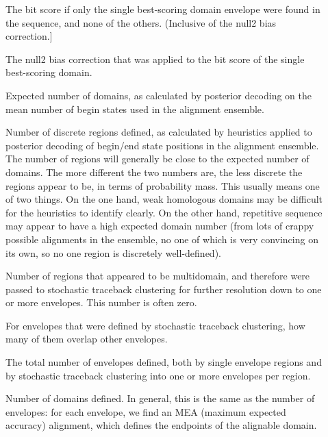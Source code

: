 \begin{description}
\item[]  The bit score if only the
  single best-scoring domain envelope were found in the sequence, and
  none of the others. (Inclusive of the null2 bias correction.]

\item[] The null2 bias correction
  that was applied to the bit score of the single best-scoring domain.

\item[] Expected number of domains, as calculated by
  posterior decoding on the mean number of begin states used in the
  alignment ensemble. 

\item[] Number of discrete regions defined, as
  calculated by heuristics applied to posterior decoding of begin/end
  state positions in the alignment ensemble.  The number of regions
  will generally be close to the expected number of domains. The more
  different the two numbers are, the less discrete the regions appear
  to be, in terms of probability mass. This usually means one of two
  things. On the one hand, weak homologous domains may be difficult
  for the heuristics to identify clearly. On the other hand,
  repetitive sequence may appear to have a high expected domain number
  (from lots of crappy possible alignments in the ensemble, no one of
  which is very convincing on its own, so no one region is discretely
  well-defined).

\item[] Number of regions that appeared to be
  multidomain, and therefore were passed to stochastic traceback
  clustering for further resolution down to one or more
  envelopes. This number is often zero.

\item[] For envelopes that were defined by stochastic
  traceback clustering, how many of them overlap other envelopes.

\item[] 
  The total number of envelopes defined, both by single envelope
  regions and by stochastic traceback clustering into one or more
  envelopes per region. 

\item[] Number of domains defined. In general, this
  is the same as the number of envelopes: for each envelope, we find
  an MEA (maximum expected accuracy) alignment, which defines the
  endpoints of the alignable domain.


\end{description}
